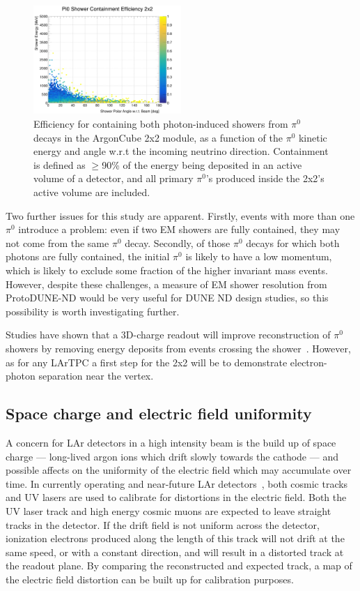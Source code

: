 \begin{figure}[htb]
  \centering
  \includegraphics[width=0.5\textwidth]{plots/2x2_minerva_plots/Pi0_cont_eff_2x2.png}
  \caption{Efficiency for containing both photon-induced showers from $\pi^{0}$ decays in the ArgonCube 2x2 module, as a function of the $\pi^{0}$ kinetic energy and angle w.r.t the incoming neutrino direction. Containment is defined as $\geq$90\% of the energy being deposited in an active volume of a detector, and all primary $\pi^{0}$'s produced inside the 2x2's active volume are included.}
  \label{fig:pi0_containment_2x2}
\end{figure}
Two further issues for this study are apparent. Firstly, events with more than one $\pi^{0}$ introduce a problem: even if two EM showers are fully contained, they may not come from the same $\pi^{0}$ decay. Secondly, of those $\pi^{0}$ decays for which both photons are fully contained, the initial $\pi^{0}$ is likely to have a low momentum, which is likely to exclude some fraction of the higher invariant mass events. However, despite these challenges, a measure of EM shower resolution from ProtoDUNE-ND would be very useful for DUNE ND design studies, so this possibility is worth investigating further.

Studies have shown that a 3D-charge readout will improve reconstruction of $\pi^{0}$ showers by removing energy deposits from events crossing the shower~\cite{Damian}. However, as for any LArTPC a first step for the 2x2 will be to demonstrate electron-photon separation near the vertex.    

\FloatBarrier
\subsection{Space charge and electric field uniformity}
\label{sec:efield}
A concern for LAr detectors in a high intensity beam is the build up of space charge --- long-lived argon ions which drift slowly towards the cathode --- and possible affects on the uniformity of the electric field which may accumulate over time. In currently operating and near-future LAr detectors~\cite{Ereditato:2014lra, Antonello:2015lea}, both cosmic tracks and UV lasers are used to calibrate for distortions in the electric field. Both the UV laser track and high energy cosmic muons are expected to leave straight tracks in the detector. If the drift field is not uniform across the detector, ionization electrons produced along the length of this track will not drift at the same speed, or with a constant direction, and will result in a distorted track at the readout plane. By comparing the reconstructed and expected track, a map of the electric field distortion can be built up for calibration purposes.

